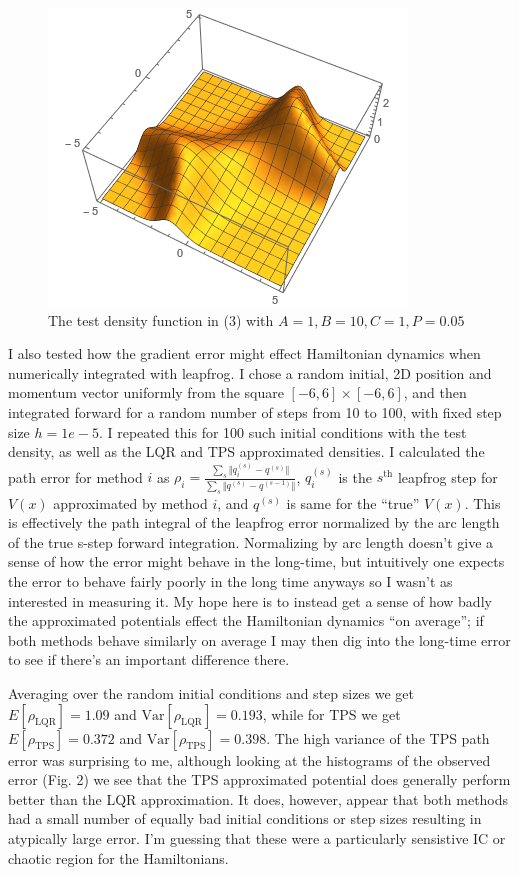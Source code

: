 \documentclass[12pt,a4paper]{article}
\begin{document}
\begin{figure}
\centering
\includegraphics[scale=.6]{./Figs/test_dense.png}
\caption{The test density function in (3) with $A = 1, B =10, C = 1, P = 0.05$}
\end{figure}

I also tested how the gradient error might effect Hamiltonian dynamics when numerically integrated with leapfrog.  I chose a random initial, 2D position and momentum vector uniformly from the square $[-6,6] \times [-6,6]$, and then integrated forward for a random number of steps from 10 to 100, with fixed step size $h = 1e-5$.  I repeated this for 100 such initial conditions with the test density, as well as the LQR and TPS approximated densities.  I calculated the path error for method $i$ as $\rho_i = \frac{ \sum\limits_s \Vert q_i^{(s)} - q^{(s)} \Vert }{ \sum\limits_s \Vert q^{(s)} - q^{(s-1)} \Vert }$, $q_i^{(s)}$ is the $s^{\text{th}}$ leapfrog step for $V(x)$ approximated by method $i$, and $q^{(s)}$ is same for the ``true'' $V(x)$.  This is effectively the path integral of the leapfrog error normalized by the arc length of the true s-step forward integration.  Normalizing by arc length doesn't give a sense of how the error might behave in the long-time, but intuitively one expects the error to behave fairly poorly in the long time anyways so I wasn't as interested in measuring it.  My hope here is to instead get a sense of how badly the approximated potentials effect the Hamiltonian dynamics ``on average''; if both methods behave similarly on average I may then dig into the long-time error to see if there's an important difference there.

Averaging over the random initial conditions and step sizes we get $E[\rho_\text{LQR}] = 1.09$ and $\text{Var}[\rho_\text{LQR}] = 0.193$, while for TPS we get $E[\rho_\text{TPS}] = 0.372$ and $\text{Var}[\rho_\text{TPS}] = 0.398$.  The high variance of the TPS path error was surprising to me, although looking at the histograms of the observed error (Fig. 2) we see that the TPS approximated potential does generally perform better than the LQR approximation.  It does, however, appear that both methods had a small number of equally bad initial conditions or step sizes resulting in atypically large error.  I'm guessing that these were a particularly sensistive IC or chaotic region for the Hamiltonians.
\end{document}
